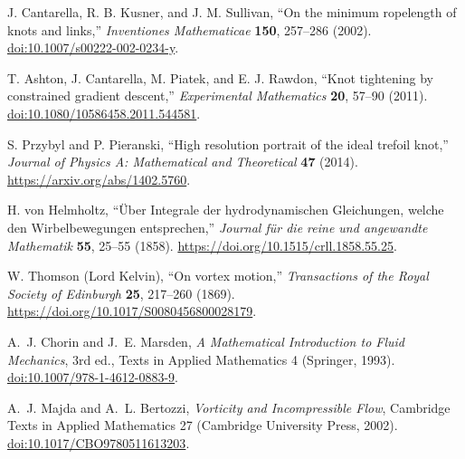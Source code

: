 J. Cantarella, R. B. Kusner, and J. M. Sullivan,
``On the minimum ropelength of knots and links,''
\textit{Inventiones Mathematicae} \textbf{150}, 257--286 (2002).
\href{https://doi.org/10.1007/s00222-002-0234-y}{doi:10.1007/s00222-002-0234-y}.

T. Ashton, J. Cantarella, M. Piatek, and E. J. Rawdon,
``Knot tightening by constrained gradient descent,''
\textit{Experimental Mathematics} \textbf{20}, 57--90 (2011).
\href{https://doi.org/10.1080/10586458.2011.544581}{doi:10.1080/10586458.2011.544581}.

S. Przybyl and P. Pieranski,
``High resolution portrait of the ideal trefoil knot,''
\textit{Journal of Physics A: Mathematical and Theoretical} \textbf{47} (2014).
\url{https://arxiv.org/abs/1402.5760}.

H. von Helmholtz,
``{\"U}ber Integrale der hydrodynamischen Gleichungen, welche den Wirbelbewegungen entsprechen,''
\textit{Journal f{\"u}r die reine und angewandte Mathematik} \textbf{55}, 25--55 (1858).
\url{https://doi.org/10.1515/crll.1858.55.25}.

W. Thomson (Lord Kelvin),
``On vortex motion,''
\textit{Transactions of the Royal Society of Edinburgh} \textbf{25}, 217--260 (1869).
\url{https://doi.org/10.1017/S0080456800028179}.

A.~J. Chorin and J.~E. Marsden,
\textit{A Mathematical Introduction to Fluid Mechanics}, 3rd ed.,
Texts in Applied Mathematics 4 (Springer, 1993).
\href{https://doi.org/10.1007/978-1-4612-0883-9}{doi:10.1007/978-1-4612-0883-9}.

A.~J. Majda and A.~L. Bertozzi,
\textit{Vorticity and Incompressible Flow},
Cambridge Texts in Applied Mathematics 27 (Cambridge University Press, 2002).
\href{https://doi.org/10.1017/CBO9780511613203}{doi:10.1017/CBO9780511613203}.
